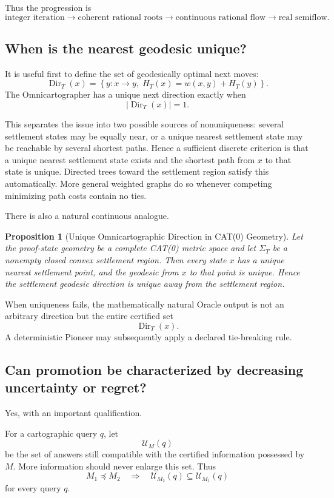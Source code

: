 \documentclass[11pt]{article}
\newtheorem{proposition}[theorem]{Proposition}
\newcommand{\Dir}{\operatorname{Dir}}
\begin{document}
Thus the progression is
\[
\text{integer iteration}
\longrightarrow
\text{coherent rational roots}
\longrightarrow
\text{continuous rational flow}
\longrightarrow
\text{real semiflow}.
\]

\subsection{When is the nearest geodesic unique?}
It is useful first to define the set of geodesically optimal next moves:
\[
\Dir_T(x)=\left\{y:x\to y,\;H_T(x)=w(x,y)+H_T(y)\right\}.
\]
The Omnicartographer has a unique next direction exactly when
\[
|\Dir_T(x)|=1.
\]

This separates the issue into two possible sources of nonuniqueness: several settlement states may be equally near, or a unique nearest settlement state may be reachable by several shortest paths. Hence a sufficient discrete criterion is that a unique nearest settlement state exists and the shortest path from $x$ to that state is unique. Directed trees toward the settlement region satisfy this automatically. More general weighted graphs do so whenever competing minimizing path costs contain no ties.

There is also a natural continuous analogue.

\begin{proposition}[Unique Omnicartographic Direction in CAT(0) Geometry]
Let the proof-state geometry be a complete CAT(0) metric space and let $\Sigma_T$ be a nonempty closed convex settlement region. Then every state $x$ has a unique nearest settlement point, and the geodesic from $x$ to that point is unique. Hence the settlement geodesic direction is unique away from the settlement region.
\end{proposition}

When uniqueness fails, the mathematically natural Oracle output is not an arbitrary direction but the entire certified set
\[
\Dir_T(x).
\]
A deterministic Pioneer may subsequently apply a declared tie-breaking rule.

\subsection{Can promotion be characterized by decreasing uncertainty or regret?}
Yes, with an important qualification.

For a cartographic query $q$, let
\[
\mathcal U_M(q)
\]
be the set of answers still compatible with the certified information possessed by $M$. More information should never enlarge this set. Thus
\[
M_1\preceq M_2
\quad\Longrightarrow\quad
\mathcal U_{M_2}(q)\subseteq\mathcal U_{M_1}(q)
\]
for every query $q$.
\end{document}
